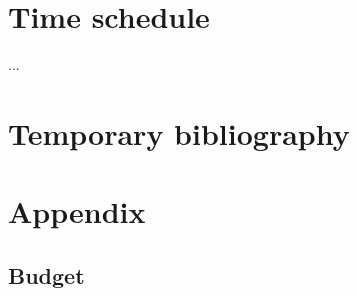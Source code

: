 \documentclass[a4paper]{article}
\begin{document}




\section{Time schedule} 
...

\section{Temporary bibliography}
 


\pagebreak
\section{Appendix}

\subsection{Budget}
\end{document}
